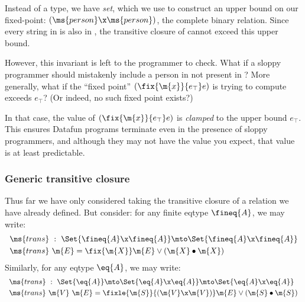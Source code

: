 Instead of a  type, we have  \emph{set}, which we use to
construct an upper bound on our fixed-point: $(\ms{person} \x \ms{person})$, the
complete binary relation. Since every string in  is also in
, the transitive closure of  cannot exceed this upper
bound.

However, this invariant is left to the programmer to check. What if a sloppy
programmer should mistakenly include a person in  not present in
? More generally, what if the ``fixed point'' $(\fix{\m{x}}{e_\top}
e)$ is trying to compute exceeds $e_\top$? (Or indeed, no such fixed point
exists?)

In that case, the value of $(\fix{\m{x}}{e_\top} e)$ is \emph{clamped} to the
upper bound $e_\top$. This ensures Datafun programs terminate even in the
presence of sloppy programmers, and although they may not have the value you
expect, that value is at least predictable.


\subsubsection{Generic transitive closure}

Thus far we have only considered taking the transitive closure of a relation we
have already defined. But consider: for any finite eqtype $\fineq{A}$, we may
write:
\[\begin{array}{l}
\ms{trans} ~:~ \Set{\fineq{A} \x \fineq{A}} \mto \Set{\fineq{A} \x \fineq{A}}
\vspace{0.3em}\\
\ms{trans}\ \m{E} = \fix{\m{X}} \m{E} \vee (\m{X} \bullet \m{X})
\end{array}\]
Similarly, for any eqtype $\eq{A}$, we may write:
\[\begin{array}{l}
\ms{trans} ~:~
\Set{\eq{A}} \mto \Set{\eq{A} \x \eq{A}} \mto \Set{\eq{A} \x \eq{A}}
\vspace{0.3em}\\
\ms{trans}\ \m{V}\ \m{E} = %
\fixle{\m{S}}{(\m{V} \x \m{V})} \m{E} \vee (\m{S} \bullet \m{S})
\end{array}\]

